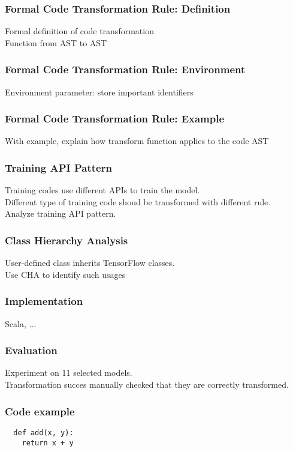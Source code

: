 \documentclass{beamer}
\begin{document}
\begin{frame}
  \frametitle{Formal Code Transformation Rule: Definition}
  Formal definition of code transformation\\
  Function from AST to AST  
\end{frame}


\begin{frame}
  \frametitle{Formal Code Transformation Rule: Environment}
  Environment parameter: store important identifiers
\end{frame}


\begin{frame}
  \frametitle{Formal Code Transformation Rule: Example}
  With example, explain how transform function applies to the code AST
\end{frame}


\begin{frame}
  \frametitle{Training API Pattern}
  Training codes use different APIs to train the model.\\
  Different type of training code shoud be transformed with different rule.\\
  Analyze training API pattern.
\end{frame}


\begin{frame}
  \frametitle{Class Hierarchy Analysis}
  User-defined class inherits TensorFlow classes.\\
  Use CHA to identify such usages
\end{frame}


\begin{frame}
  \frametitle{Implementation}
  Scala, ...
\end{frame}


\begin{frame}
  \frametitle{Evaluation}
  Experiment on 11 selected models.\\
  Transformation succes
  manually checked that they are correctly transformed.\\
\end{frame}


\begin{frame}[fragile]
  \frametitle{Code example}
  \begin{verbatim}
  def add(x, y):
    return x + y
  \end{verbatim}
\end{frame}
\end{document}
